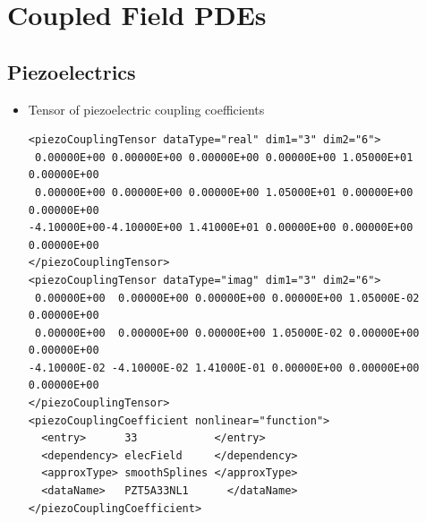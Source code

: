 \chapter{Coupled Field PDEs}

\section{Piezoelectrics}

\begin{itemize}
\item Tensor of piezoelectric coupling coefficients
\begin{verbatim}
<piezoCouplingTensor dataType="real" dim1="3" dim2="6">
 0.00000E+00 0.00000E+00 0.00000E+00 0.00000E+00 1.05000E+01 0.00000E+00
 0.00000E+00 0.00000E+00 0.00000E+00 1.05000E+01 0.00000E+00 0.00000E+00
-4.10000E+00-4.10000E+00 1.41000E+01 0.00000E+00 0.00000E+00 0.00000E+00
</piezoCouplingTensor>
<piezoCouplingTensor dataType="imag" dim1="3" dim2="6">
 0.00000E+00  0.00000E+00 0.00000E+00 0.00000E+00 1.05000E-02 0.00000E+00
 0.00000E+00  0.00000E+00 0.00000E+00 1.05000E-02 0.00000E+00 0.00000E+00
-4.10000E-02 -4.10000E-02 1.41000E-01 0.00000E+00 0.00000E+00 0.00000E+00
</piezoCouplingTensor>
<piezoCouplingCoefficient nonlinear="function">
  <entry>      33            </entry>
  <dependency> elecField     </dependency>
  <approxType> smoothSplines </approxType>
  <dataName>   PZT5A33NL1      </dataName>
</piezoCouplingCoefficient>
\end{verbatim}

\end{itemize}

